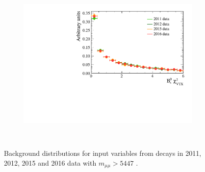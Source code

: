 \begin{figure}
 \begin{subfigure}[b]{0.48\textwidth}
        \includegraphics[width=\textwidth]{./Figs/Appendix1/bkgnd_vertex.pdf}
    \end{subfigure}
    ~ %
 



    \caption{Background distributions for input variables from \bbbarmumux decays in 2011, 2012, 2015 and 2016 data with $m_{\mu \mu} > 5447$ \mevcc.}
    \label{fig:signalvars}
\end{figure}

